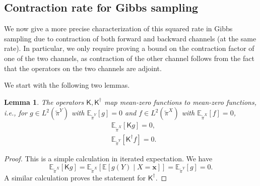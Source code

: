 \documentclass[11pt]{article}
\newtheorem{lemma}{Lemma}
\newcommand{\0}{\mathbf{0}}
\newcommand{\1}{\mathbf{1}}
\newcommand{\vx}{\mathbf{x}}
\newcommand{\sfK}{\mathsf{K}}
\newcommand{\tpi}{\tilde{\pi}}
\begin{document}
\subsection{Contraction rate for Gibbs sampling}

We now give a more precise characterization of this squared rate in Gibbs sampling due to contraction of both forward and backward channels (at the same rate). In particular, we only require proving a bound on the contraction factor of one of the two channels, as contraction of the other channel follows from the fact that the operators on the two channels are adjoint.

We start with the following two lemmas.

\begin{lemma}\label{lem:mean-zero-map}
    The operators $\sfK, \sfK^\dagger$ map mean-zero functions to mean-zero functions, i.e., for $g\in L^2(\tpi^Y)$ with  $\mathbb{E}_{\tpi^Y}[g]=0$ and  $f\in L^2(\tpi^X)$ with $\mathbb{E}_{\tpi^X}[f]=0$, 
    \begin{align*}
        &\mathbb{E}_{\tpi^X}[\sfK g]=0,\\
        &\mathbb{E}_{\tpi^Y}[\sfK^\dagger f]=0.
    \end{align*}
\end{lemma}
\begin{proof}
    This is a simple calculation in iterated expectation.  We have
    \[\mathbb{E}_{\tpi^X}[\sfK g]=\mathbb{E}_{\tpi^X}[\mathbb{E}[g(Y)\mid X=\vx]]=\mathbb{E}_{\tpi^Y}[g]=0.\]
    A similar calculation proves the statement for $\sfK^\dagger$.
\end{proof}
\end{document}
